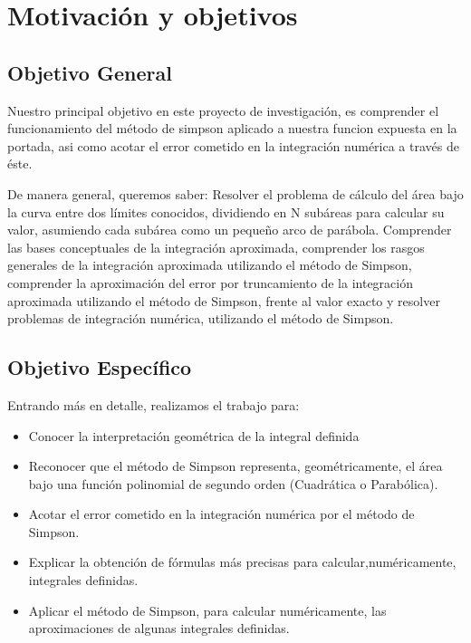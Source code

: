 \documentclass[spanish,a4paper,11pt]{report}
\begin{document}
\tableofcontents

\newpage{\pagestyle{empty}\cleardoublepage}

\renewcommand{\thepage}{\arabic{page}}
\setcounter{page}{1}

\setlength{\parindent}{5mm}

\chapter{Motivación y objetivos}

\section{Objetivo General}
\label{chapter:obj}

\parindent=1cm Nuestro principal objetivo en este proyecto de investigación, es comprender el funcionamiento del método de 
simpson aplicado a nuestra funcion expuesta en la portada, asi como acotar el error cometido en la integración numérica a través de éste.

\parindent=1cm De manera general, queremos saber: 
Resolver el problema de cálculo del área bajo la curva entre dos límites conocidos, dividiendo en N subáreas para calcular 
su valor, asumiendo cada subárea como un pequeño arco de parábola. 
Comprender las bases conceptuales de la integración aproximada,
comprender los rasgos generales de la integración aproximada utilizando el método de Simpson,
comprender la aproximación del error por truncamiento de la integración aproximada utilizando el método de Simpson, frente al 
valor exacto y resolver problemas de integración numérica, utilizando el método de Simpson.





\section{Objetivo Específico}
\label{chapter:espec}

\parindent=1cm Entrando más en detalle, realizamos el trabajo para:  

\begin{itemize}
  \item Conocer la interpretación geométrica de la integral definida
  \item Reconocer que el método de Simpson representa, geométricamente, el área bajo una función polinomial de segundo orden 
  (Cuadrática o Parabólica).
  \item Acotar el error cometido en la integración numérica por el método de Simpson.
  \item Explicar la obtención de fórmulas más precisas para calcular,numéricamente, integrales definidas.
  \item Aplicar el método de Simpson, para calcular numéricamente, las aproximaciones de algunas integrales definidas.
\end{itemize}
\end{document}
